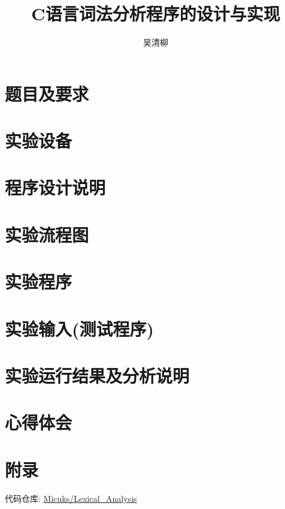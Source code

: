 \documentclass[12pt]{article}
\title{C语言词法分析程序的设计与实现}
\author{\textup{吴清柳}}
\begin{document}

\tableofcontents
\newpage

\section{题目及要求}

\section{实验设备}

\section{程序设计说明}

\section{实验流程图}

\section{实验程序}

\section{实验输入(测试程序)}

\section{实验运行结果及分析说明}

\section{心得体会}

\section{附录}
代码仓库: \href{https://github.com/Micuks/Lexical\_Analysis}{Micuks/Lexical\_Analysis}

% 
% 
\end{document}
